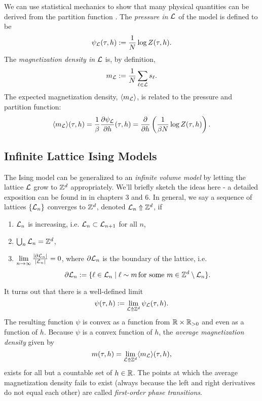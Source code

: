 \documentclass[11pt,reqno]{amsart}
\begin{document}
	We can use statistical mechanics to show that many physical quantities can be derived from the partition function \cite[Ch. 3]{friedli_velenik_2017}.
	The \emph{pressure in $\mathcal{L}$} of the model is defined to be 
	\[\psi_{\mathcal{L}}(\tau,h):=\frac{1}{N} \log Z(\tau,h).  \]
	The \emph{magnetization density in $\mathcal{L}$} is, by definition,
	\[ m_{\mathcal{L}}:=\frac{1}{N}\sum_{\ell \in \mathcal{L}} s_\ell. \]
	The expected magnetization density, $\langle m_{\mathcal{L}} \rangle$, is related to the pressure and partition function:
	\[\langle m_{\mathcal{L}} \rangle (\tau,h) = \frac{1}{\beta}\frac{\partial \psi_{\mathcal{L}}}{\partial h}(\tau, h)=\frac{\partial}{\partial h}\left( \frac{1}{\beta N} \log Z(\tau,h)\right) . \]
	
	
	\subsection{Infinite Lattice Ising Models}
	
	The Ising model can be generalized to an \emph{infinite volume model} by letting the lattice $\mathcal{L}$ grow to $\mathbb{Z}^d$ appropriately. 
	We'll briefly sketch the ideas here - a detailed exposition can be found in \cite{friedli_velenik_2017} in chapters 3 and 6.
	In general, we say a sequence of lattices $\{\mathcal{L}_n \}$ converges to $\mathbb{Z}^d$, denoted $\mathcal{L}_n \Uparrow \mathbb{Z}^d$, if 
	\begin{enumerate}
		\item $\mathcal{L}_n$ is increasing, i.e. $\mathcal{L}_n \subset \mathcal{L}_{n+1}$ for all $n$,
		\item $\bigcup_{n} \mathcal{L}_n = \mathbb{Z}^d$,
		\item $\lim\limits_{n\to \infty} \frac{|\partial \mathcal{L}_n|}{|\mathcal{L}_n|}=0$, where $\partial \mathcal{L}_n$ is the boundary of the lattice, i.e. 
		\[\partial \mathcal{L}_n := \{\ell \in \mathcal{L}_n \mid \ell \sim m \, \text{for some $m$}\in \mathbb{Z}^d \setminus \mathcal{L}_n \}. \]
	\end{enumerate}
	It turns out that there is a well-defined limit 
		\[\psi(\tau,h):= \lim\limits_{\mathcal{L} \Uparrow \mathbb{Z}^d} \psi_{\mathcal{L}}(\tau,h).\]
	The resulting function $\psi$ is convex as a function from $\mathbb{R} \times \mathbb{R}_{>0}$ and even as a function of $h$.
	Because $\psi$ is a convex function of $h$, the \emph{average magnetization density} given by
		\[m(\tau,h)=\lim_{\mathcal{L} \Uparrow \mathbb{Z}^d} \langle m_{\mathcal{L}} \rangle (\tau, h), \]
	exists for all but a countable set of $h \in \mathbb{R}$.
	The points at which the average magnetization density fails to exist (always because the left and right derivatives do not equal each other) are called \emph{first-order phase transitions}.
		
\end{document}

